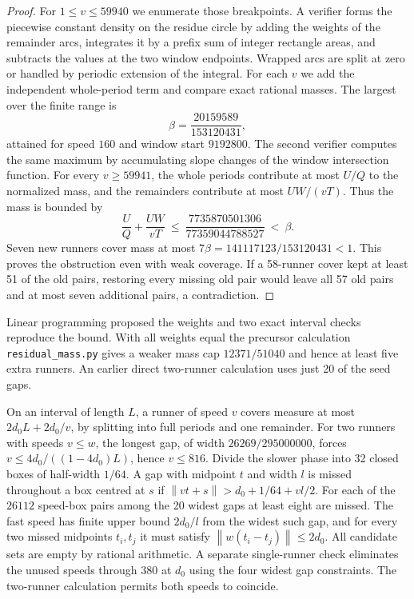 \documentclass[11pt]{article}
\newcommand{\norm}[1]{\left\lVert #1\right\rVert}
\begin{document}
\begin{proof}
For \(1\le v\le59940\) we enumerate those breakpoints.
A verifier forms the piecewise constant density on the residue
circle by adding the weights of the remainder arcs, integrates it
by a prefix sum of integer rectangle areas, and subtracts the
values at the two window endpoints. Wrapped arcs are split at
zero or handled by periodic extension of the integral.
For each \(v\) we add the independent whole-period term and
compare exact rational masses. The largest over the finite range is
\[
 \beta=\frac{20159589}{153120431},
\]
attained for speed \(160\) and window start \(9192800\).
The second verifier computes the same maximum by accumulating
slope changes of the window intersection function.
For every \(v\ge59941\), the whole periods contribute at most \(U/Q\)
to the normalized mass, and the remainders contribute at most
\(UW/(vT)\). Thus the mass is bounded by
\[
 \frac UQ+\frac{UW}{vT}
 \ \le\ \frac{7735870501306}{77359044788527}
 \ <\ \beta .
\]
Seven new runners cover mass at most
\(7\beta=141117123/153120431<1\).
This proves the obstruction even with weak coverage.
If a 58-runner cover kept at least 51 of the old pairs,
restoring every missing old pair would leave all 57 old pairs and at
most seven additional pairs, a contradiction.
\end{proof}

Linear programming proposed the weights and two exact interval
checks reproduce the bound. With all weights equal the precursor calculation
\texttt{residual\_mass.py} gives a weaker mass cap \(12371/51040\)
and hence at least five extra runners. An earlier direct
two-runner calculation uses just 20 of the seed gaps.

On an interval of length \(L\), a runner of speed \(v\) covers
measure at most \(2d_0L+2d_0/v\), by splitting into full periods and
one remainder. For two runners with speeds \(v\le w\), the longest
gap, of width \(26269/295000000\), forces
\(v\le 4d_0/((1-4d_0)L)\), hence \(v\le816\).
Divide the slower phase into 32 closed boxes of half-width \(1/64\).
A gap with midpoint \(t\) and width \(l\) is missed throughout a box
centred at \(s\) if
\(\norm{vt+s}>d_0+1/64+vl/2\).
For each of the \(26112\) speed-box pairs among the 20 widest gaps
at least eight are missed. The fast speed has finite upper bound
\(2d_0/l\) from the widest such gap, and for every two missed
midpoints \(t_i,t_j\) it must satisfy
\(\norm{w(t_i-t_j)}\le2d_0\).
All candidate sets are empty by rational arithmetic.
A separate single-runner check eliminates the unused speeds through
380 at \(d_0\) using the four widest gap constraints.
The two-runner calculation permits both speeds to coincide.
\end{document}

